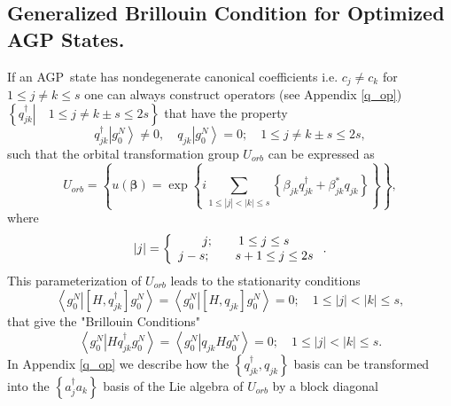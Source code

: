 \documentclass[aps,preprint]{revtex4}%
\begin{document}
\subsection{Generalized Brillouin Condition for Optimized AGP
States.\label{Brillouin}}

If an AGP\ state has nondegenerate canonical coefficients i.e. $c_{j}\neq
c_{k}$ for $1\leq j\neq k\leq s$ one can \cite{AGPCoherent}\cite{Weiner83a}%
\cite{Kurtz83} always construct operators (see Appendix \ref{q_op}) $\left\{
\left.  q_{jk}^{\dagger}\right\vert \quad1\leq j\neq k\pm s\leq2s\right\}  $
that have the property
\begin{equation}
q_{jk}^{\dagger}\left\vert g_{0}^{N}\right\rangle \neq0,\quad q_{jk}\left\vert
g_{0}^{N}\right\rangle =0;\quad1\leq j\neq k\pm s\leq2s,
\end{equation}
such that the orbital transformation group $U_{orb}$ can be expressed as
\begin{equation}
U_{orb}=\left\{  u\left(  \bm{\beta}\right)  =\exp\left\{  i\sum
_{1\leq\left\vert j\right\vert <\left\vert k\right\vert \leq s}\left\{
\beta_{jk}q_{jk}^{\dagger}+\beta_{jk}^{\ast}q_{jk}\right\}  \right\}
\right\}  ,
\end{equation}
where
\begin{equation}
\left\vert j\right\vert =\left\{
\begin{array}
[c]{c}%
j;\qquad1\leq j\leq s\\
j-s;\qquad s+1\leq j\leq2s
\end{array}
\right.  .
\end{equation}
This parameterization of $U_{orb}$ leads to the stationarity conditions
\begin{equation}
\left\langle \left.  g_{0}^{N}\right\vert \left[  H,q_{jk}^{\dagger}\right]
g_{0}^{N}\right\rangle =\left\langle \left.  g_{0}^{N}\right\vert \left[
H,q_{jk}\right]  g_{0}^{N}\right\rangle =0;\quad1\leq\left\vert j\right\vert
<\left\vert k\right\vert \leq s,
\end{equation}
that give the "Brillouin Conditions"
\begin{equation}
\left\langle \left.  g_{0}^{N}\right\vert Hq_{jk}^{\dagger}g_{0}%
^{N}\right\rangle =\left\langle \left.  g_{0}^{N}\right\vert q_{jk}Hg_{0}%
^{N}\right\rangle =0;\quad1\leq\left\vert j\right\vert <\left\vert
k\right\vert \leq s. \label{BC}%
\end{equation}
In Appendix \ref{q_op} we describe how the $\left\{  q_{jk}^{\dagger}%
,q_{jk}\right\}  $ basis can be transformed into the $\left\{  a_{j}^{\dagger
}a_{k}\right\}  $ basis of the Lie algebra of $U_{orb}$ by a block diagonal
\end{document}
